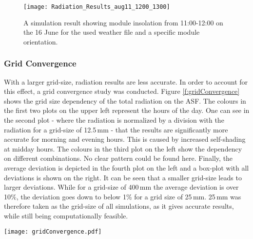			\begin{figure}[H]
			\begin{center}
				\texttt{[image: Radiation\_Results\_aug11\_1200\_1300]}
				\caption{A simulation result showing module insolation from 11:00-12:00 on the 16 June for the used weather file and a specific module orientation.}
				\label{fig:radiation}
			\end{center}
			\end{figure}

			\subsubsection{Grid Convergence}
			\label{ss:gridconvergence}

				With a larger grid-size, radiation results are less accurate. In order to account for this effect, a grid convergence study was conducted. Figure \ref{f:gridConvergence} shows the grid size dependency of the total radiation on the ASF. The colours in the first two plots on the upper left represent the hours of the day. One can see in the second plot - where the radiation is normalized by a division with the radiation for a grid-size of 12.5\,mm - that the results are significantly more accurate for morning and evening hours. This is caused by increased self-shading at midday hours. The colours in the third plot on the left show the dependency on different combinations. No clear pattern could be found here. Finally, the average deviation is depicted in the fourth plot on the left and a box-plot with all deviations is shown on the right. It can be seen that a smaller grid-size leads to larger deviations. While for a grid-size of 400\,mm the average deviation is over 10\%, the deviation goes down to below 1\% for a grid size of 25\,mm. 25\,mm was therefore taken as the grid-size of all simulations, as it gives accurate results, while still being computationally feasible. 

				\begin{figure*}
					\begin{center}
					\texttt{[image: gridConvergence.pdf]}
					\caption{Grid convergence evaluation}
					\label{f:gridConvergence}
					\end{center}
				\end{figure*}

